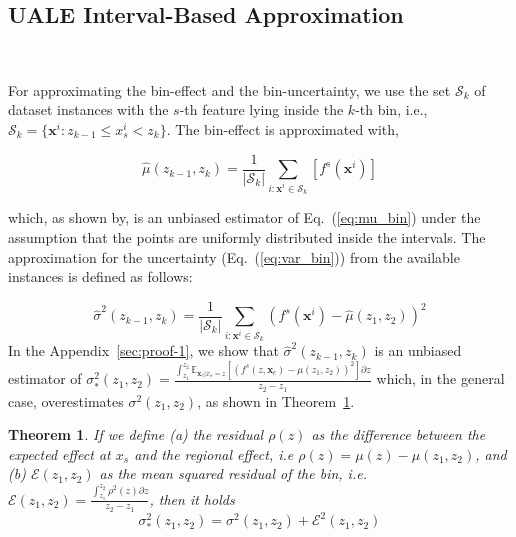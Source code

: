 \documentclass[twoside]{article}
\newtheorem{theorem}{Theorem}[section]
\newcommand{\dfdx}{f^s}
\newcommand{\xc}{\mathbf{x}_c}
\begin{document}
\subsection{UALE Interval-Based Approximation}
~\label{sec:UALE-approximation}

For approximating the bin-effect and the bin-uncertainty, we use the
set \(\mathcal{S}_k\) of dataset instances with the \(s\)-th feature
lying inside the \(k\)-th bin, i.e.,
\( \mathcal{S}_k= \{ \mathbf{x}^i : z_{k-1} \leq x^i_s < z_k \}
\). The bin-effect is approximated with,

\begin{equation}
  \label{eq:mu_bin_approx}
  \hat{\mu}(z_{k-1}, z_k) = \frac{1}{|\mathcal{S}_k|}
  \sum_{i:\mathbf{x}^i \in \mathcal{S}_k} \left [ \dfdx(\mathbf{x}^i)
  \right ]
\end{equation}

%
which, as shown by\citep{gkolemis22}, is an unbiased estimator of
Eq.~(\ref{eq:mu_bin}) under the assumption that the points are
uniformly distributed inside the intervals. The approximation for the
uncertainty (Eq.~(\ref{eq:var_bin})) from the available instances is
defined as follows:

%
\begin{equation}
  \label{eq:var_bin_approx}
  \hat{\sigma}^2(z_{k-1}, z_k) = \frac{1}{|\mathcal{S}_k|}
\sum_{i:\mathbf{x}^i \in \mathcal{S}_k} \left ( \dfdx(\mathbf{x}^i) -
  \hat{\mu}(z_1, z_2) \right )^2
\end{equation}
%
In the Appendix~\ref{sec:proof-1}, we show that
\(\hat{\sigma}^2(z_{k-1}, z_k)\) is an unbiased estimator of
\(\sigma^2_*(z_1, z_2) = \frac{\int_{z_1}^{z_2} \mathbb{E}_{\xc|x_s=z}
  \left [ (f^s(z, \xc) - \mu(z_1, z_2) )^2 \right] \partial z}{z_2 -
  z_1} \)
%
which, in the general case, overestimates
\(\sigma^2(z_1, z_2)\), as shown in Theorem~\ref{sec:theorem-1}.

\begin{theorem}
  \label{sec:theorem-1}
  If we define (a) the residual \(\rho(z)\) as the difference between
  the expected effect at \(x_s\) and the regional effect, i.e
  \(\rho(z) = \mu(z) - \mu(z_1, z_2)\), and (b) \(\mathcal{E}(z_1, z_2)\) as the
  mean squared residual of the bin, i.e.
  \(\mathcal{E}(z_1, z_2) = \frac{\int_{z_1}^{z_2}\rho^2(z) \partial
    z}{z_2 - z_1}\), then it holds
\begin{equation}
    \label{eq:bin-uncertainty-proof}
 \sigma_*^2(z_1, z_2) = \sigma^2(z_1, z_2) + \mathcal{E}^2(z_1, z_2)
\end{equation}
  \end{theorem}
\end{document}
